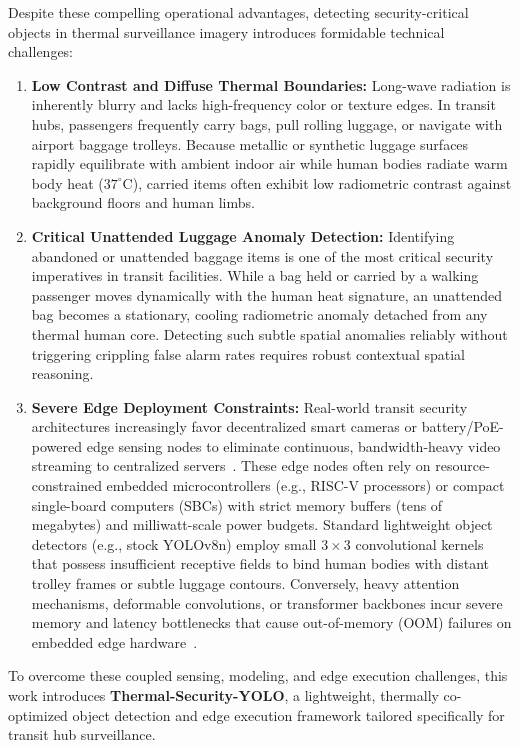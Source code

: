 \documentclass[journal,twoside,web]{ieeecolor}
\begin{document}
Despite these compelling operational advantages, detecting security-critical objects in thermal surveillance imagery introduces formidable technical challenges:
\begin{enumerate}
    \item \textbf{Low Contrast and Diffuse Thermal Boundaries:} Long-wave radiation is inherently blurry and lacks high-frequency color or texture edges. In transit hubs, passengers frequently carry bags, pull rolling luggage, or navigate with airport baggage trolleys. Because metallic or synthetic luggage surfaces rapidly equilibrate with ambient indoor air while human bodies radiate warm body heat ($37^\circ\text{C}$), carried items often exhibit low radiometric contrast against background floors and human limbs.
    \item \textbf{Critical Unattended Luggage Anomaly Detection:} Identifying abandoned or unattended baggage items is one of the most critical security imperatives in transit facilities. While a bag held or carried by a walking passenger moves dynamically with the human heat signature, an unattended bag becomes a stationary, cooling radiometric anomaly detached from any thermal human core. Detecting such subtle spatial anomalies reliably without triggering crippling false alarm rates requires robust contextual spatial reasoning.
    \item \textbf{Severe Edge Deployment Constraints:} Real-world transit security architectures increasingly favor decentralized smart cameras or battery/PoE-powered edge sensing nodes to eliminate continuous, bandwidth-heavy video streaming to centralized servers~\cite{humes2023squeezed,okano2025edge}. These edge nodes often rely on resource-constrained embedded microcontrollers (e.g., RISC-V processors) or compact single-board computers (SBCs) with strict memory buffers (tens of megabytes) and milliwatt-scale power budgets. Standard lightweight object detectors (e.g., stock YOLOv8n) employ small $3\times3$ convolutional kernels that possess insufficient receptive fields to bind human bodies with distant trolley frames or subtle luggage contours. Conversely, heavy attention mechanisms, deformable convolutions, or transformer backbones incur severe memory and latency bottlenecks that cause out-of-memory (OOM) failures on embedded edge hardware~\cite{luo2025yolo,li2024yolo}.
\end{enumerate}

To overcome these coupled sensing, modeling, and edge execution challenges, this work introduces \textbf{Thermal-Security-YOLO}, a lightweight, thermally co-optimized object detection and edge execution framework tailored specifically for transit hub surveillance. 
\end{document}
